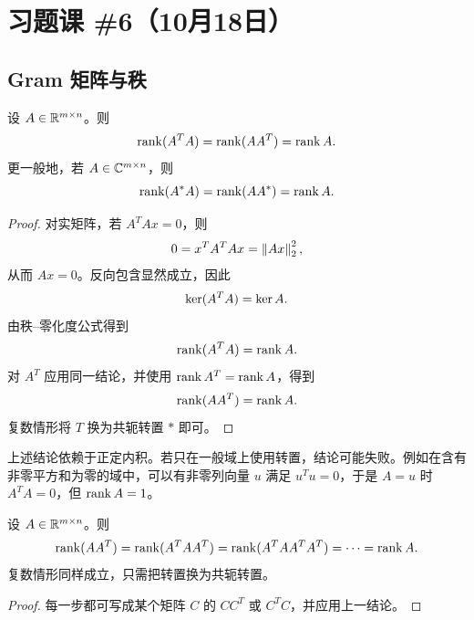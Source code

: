 \section{习题课 \#6（10月18日）}

\subsection{Gram 矩阵与秩}

\begin{theorem}
设 $A\in\mathbb R^{m\times n}$。则
\begin{equation}
 \operatorname{rank}(A^TA)=\operatorname{rank}(AA^T)=\operatorname{rank} A.
\end{equation}
更一般地，若 $A\in\mathbb C^{m\times n}$，则
\begin{equation}
 \operatorname{rank}(A^*A)=\operatorname{rank}(AA^*)=\operatorname{rank} A.
\end{equation}
\end{theorem}

\begin{proof}
对实矩阵，若 $A^TAx=0$，则
\begin{equation}
 0=x^TA^TAx=\left\lVert Ax\right\rVert_2^2,
\end{equation}
从而 $Ax=0$。反向包含显然成立，因此
\begin{equation}
 \operatorname{ker}(A^TA)=\operatorname{ker} A.
\end{equation}
由秩--零化度公式得到
\begin{equation}
 \operatorname{rank}(A^TA)=\operatorname{rank} A.
\end{equation}
对 $A^T$ 应用同一结论，并使用 $\operatorname{rank} A^T=\operatorname{rank} A$，得到
\begin{equation}
 \operatorname{rank}(AA^T)=\operatorname{rank} A.
\end{equation}
复数情形将 $T$ 换为共轭转置 $*$ 即可。
\end{proof}

\begin{remark}
上述结论依赖于正定内积。若只在一般域上使用转置，结论可能失败。例如在含有非零平方和为零的域中，可以有非零列向量 $u$ 满足 $u^Tu=0$，于是 $A=u$ 时 $A^TA=0$，但 $\operatorname{rank} A=1$。
\end{remark}

\begin{proposition}
设 $A\in\mathbb R^{m\times n}$。则
\begin{equation}
 \operatorname{rank}(AA^T)=\operatorname{rank}(A^TAA^T)=\operatorname{rank}(A^TAA^TA^T)=\cdots=\operatorname{rank} A.
\end{equation}
复数情形同样成立，只需把转置换为共轭转置。
\end{proposition}

\begin{proof}
每一步都可写成某个矩阵 $C$ 的 $CC^T$ 或 $C^TC$，并应用上一结论。
\end{proof}

